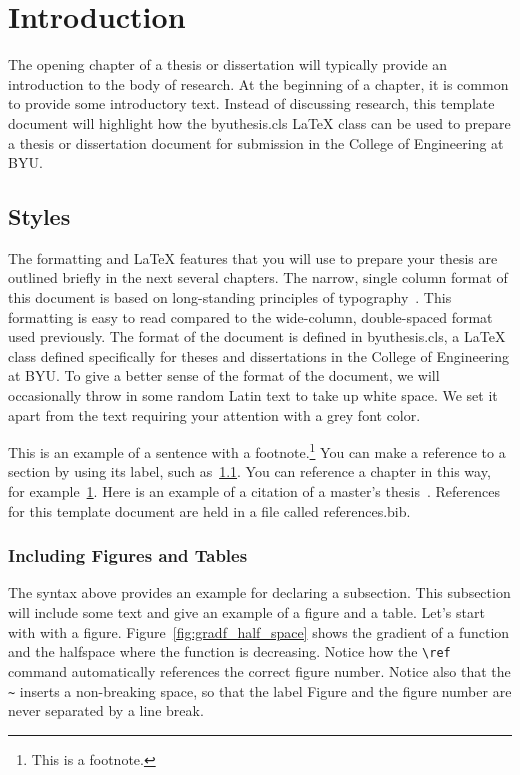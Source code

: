 \chapter{Introduction}
\label{ch:intro}

The opening chapter of a thesis or dissertation will typically provide an introduction to the body of research. At the beginning of a chapter, it is common to provide some introductory text. Instead of discussing research, this template document will highlight how the {\ttfamily byuthesis.cls} \LaTeX{} class can be used to prepare a thesis or dissertation document for submission in the College of Engineering at BYU.

\section{Styles}
\label{sec:intro_styles}
The formatting and \LaTeX{} features that you will use to prepare your thesis are outlined briefly in the next several chapters. The narrow, single column format of this document is based on long-standing principles of typography~\cite{Bringhurst19}. This formatting is easy to read compared to the wide-column, double-spaced format used previously. The format of the document is defined in {\ttfamily byuthesis.cls}, a \LaTeX{} class defined specifically for theses and dissertations in the College of Engineering at BYU. To give a better sense of the format of the document, we will occasionally throw in some random Latin text to take up white space. We set it apart from the text requiring your attention with a grey font color.

{\color{mediumgray} \blindtext}

This is an example of a sentence with a footnote.\footnote{This is a footnote.} You can make a reference to a section by using its label, such as~\cref{sec:intro_styles}. You can reference a chapter in this way, for example~\cref{ch:intro}. Here is an example of a citation of a master's thesis~\cite{masters1}. References for this template document are held in a file called {\ttfamily references.bib}.

\subsection{Including Figures and Tables}
The syntax above provides an example for declaring a subsection. This subsection will include some text and give an example of a figure and a table. Let's start with with a figure. Figure~\ref{fig:gradf_half_space} shows the gradient of a function and the halfspace where the function is decreasing. Notice how the \verb|\ref| command automatically references the correct figure number. Notice also that the \verb|~| inserts a non-breaking space, so that the label Figure and the figure number are never separated by a line break.

